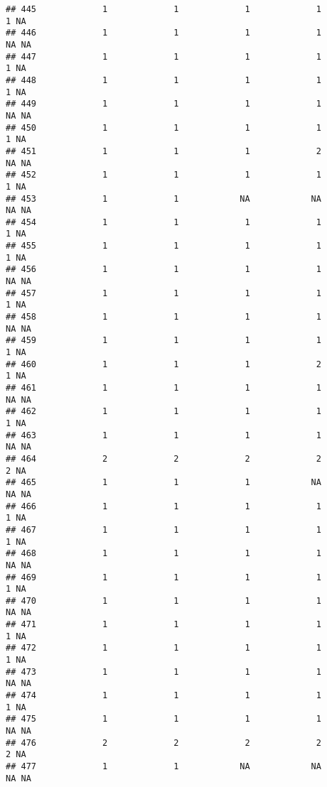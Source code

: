 \documentclass[
]{article}
\begin{document}
\begin{verbatim}
## 445             1             1             1             1             1 NA
## 446             1             1             1             1            NA NA
## 447             1             1             1             1             1 NA
## 448             1             1             1             1             1 NA
## 449             1             1             1             1            NA NA
## 450             1             1             1             1             1 NA
## 451             1             1             1             2            NA NA
## 452             1             1             1             1             1 NA
## 453             1             1            NA            NA            NA NA
## 454             1             1             1             1             1 NA
## 455             1             1             1             1             1 NA
## 456             1             1             1             1            NA NA
## 457             1             1             1             1             1 NA
## 458             1             1             1             1            NA NA
## 459             1             1             1             1             1 NA
## 460             1             1             1             2             1 NA
## 461             1             1             1             1            NA NA
## 462             1             1             1             1             1 NA
## 463             1             1             1             1            NA NA
## 464             2             2             2             2             2 NA
## 465             1             1             1            NA            NA NA
## 466             1             1             1             1             1 NA
## 467             1             1             1             1             1 NA
## 468             1             1             1             1            NA NA
## 469             1             1             1             1             1 NA
## 470             1             1             1             1            NA NA
## 471             1             1             1             1             1 NA
## 472             1             1             1             1             1 NA
## 473             1             1             1             1            NA NA
## 474             1             1             1             1             1 NA
## 475             1             1             1             1            NA NA
## 476             2             2             2             2             2 NA
## 477             1             1            NA            NA            NA NA

\end{verbatim}
\end{document}
